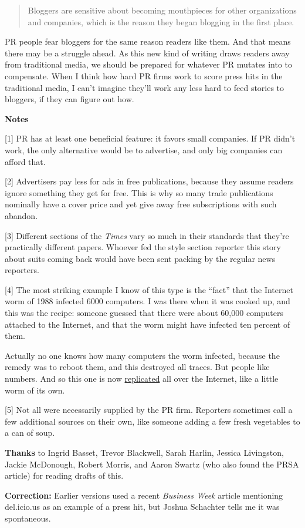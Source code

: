 \begin{quote}
Bloggers are sensitive about becoming mouthpieces for other
organizations and companies, which is the reason they began blogging in
the first place.
\end{quote}

PR people fear bloggers for the same reason readers like them. And that
means there may be a struggle ahead. As this new kind of writing draws
readers away from traditional media, we should be prepared for whatever
PR mutates into to compensate. When I think how hard PR firms work to
score press hits in the traditional media, I can't imagine they'll work
any less hard to feed stories to bloggers, if they can figure out how.

\textbf{Notes}

{[}1{]} PR has at least one beneficial feature: it favors small
companies. If PR didn't work, the only alternative would be to
advertise, and only big companies can afford that.

{[}2{]} Advertisers pay less for ads in free publications, because they
assume readers ignore something they get for free. This is why so many
trade publications nominally have a cover price and yet give away free
subscriptions with such abandon.

{[}3{]} Different sections of the \emph{Times} vary so much in their
standards that they're practically different papers. Whoever fed the
style section reporter this story about suits coming back would have
been sent packing by the regular news reporters.

{[}4{]} The most striking example I know of this type is the ``fact''
that the Internet worm of 1988 infected 6000 computers. I was there when
it was cooked up, and this was the recipe: someone guessed that there
were about 60,000 computers attached to the Internet, and that the worm
might have infected ten percent of them.

Actually no one knows how many computers the worm infected, because the
remedy was to reboot them, and this destroyed all traces. But people
like numbers. And so this one is now
\href{http://www.google.com/search?q=internet+worm+1988+6000}{replicated}
all over the Internet, like a little worm of its own.

{[}5{]} Not all were necessarily supplied by the PR firm. Reporters
sometimes call a few additional sources on their own, like someone
adding a few fresh vegetables to a can of soup.

\textbf{Thanks} to Ingrid Basset, Trevor Blackwell, Sarah Harlin,
Jessica Livingston, Jackie McDonough, Robert Morris, and Aaron Swartz
(who also found the PRSA article) for reading drafts of this.

\textbf{Correction:} Earlier versions used a recent \emph{Business Week}
article mentioning del.icio.us as an example of a press hit, but Joshua
Schachter tells me it was spontaneous.
